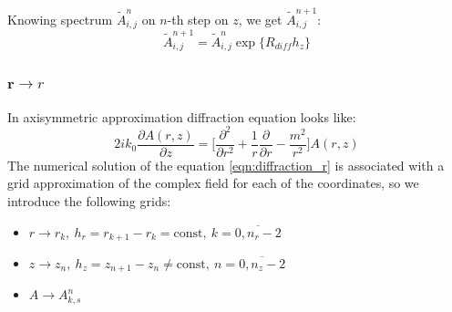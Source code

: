 \documentclass[a4paper, 12pt]{article}
\begin{document}
Knowing spectrum $\tilde{A}^n_{i,j}$ on $n$-th step on $z$, we get $\tilde{A}^{n+1}_{i,j}$:
\begin{equation}
\tilde{A}^{n+1}_{i,j} = \tilde{A}^n_{i,j} \exp\{R_{diff} h_z \}
\end{equation}



\subsubsection{$\mathbf{r}\longrightarrow r$}
In axisymmetric approximation diffraction equation looks like:
\begin{equation}
\label{eqn:diffraction_r}
2 i k_0 \frac{\partial A (r, z)}{\partial z} = \biggl[ \frac{\partial^2}{\partial r^2} + \frac1{r}\frac{\partial}{\partial r} - \frac{m^2}{r^2} \biggr] A(r,z)
\end{equation}
The numerical solution of the equation \eqref{eqn:diffraction_r} is associated with a grid approximation of the complex field for each of the coordinates, so we introduce the following grids:
\begin{itemize}
\item $r\longrightarrow r_k, \ h_r = r_{k+1} - r_{k} = \text{const}, \ k = \overline{0, n_r-2}$
\item $z\longrightarrow z_n, \ h_z = z_{n+1} - z_{n} \ne \text{const}, \ n = \overline{0, n_z-2}$
\item $A \longrightarrow A^n_{k, s}$
\end{itemize}
\end{document}
